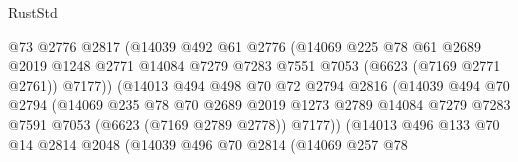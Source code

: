 \begin{lexlean}{RustStd}
\begin{coremodule}
                                @73
                                @2776
                                @2817
                                (@14039
                                  @492
                                  @61
                                  @2776
                                  (@14069
                                    @225
                                    @78
                                    @61
                                    @2689
                                    @2019
                                    @1248
                                    @2771
                                    @14084
                                    @7279
                                    @7283
                                    @7551
                                    @7053
                                    (@6623 (@7169 @2771 @2761))
                                    @7177))
                                (@14013
                                  @494
                                  @498
                                  @70
                                  @72
                                  @2794
                                  @2816
                                  (@14039
                                    @494
                                    @70
                                    @2794
                                    (@14069
                                      @235
                                      @78
                                      @70
                                      @2689
                                      @2019
                                      @1273
                                      @2789
                                      @14084
                                      @7279
                                      @7283
                                      @7591
                                      @7053
                                      (@6623 (@7169 @2789 @2778))
                                      @7177))
                                  (@14013
                                    @496
                                    @133
                                    @70
                                    @14
                                    @2814
                                    @2048
                                    (@14039
                                      @496
                                      @70
                                      @2814
                                      (@14069
                                        @257
                                        @78

\end{coremodule}
\end{lexlean}
